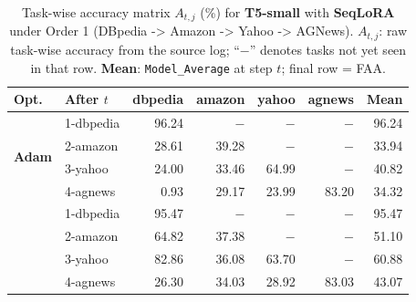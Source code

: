 \begin{table}[ht]
\centering
\caption{%
  Task-wise accuracy matrix $A_{t,j}$ (\%) for \textbf{T5-small} with \textbf{SeqLoRA} under Order 1 (DBpedia -> Amazon -> Yahoo -> AGNews).
  $A_{t,j}$: raw task-wise accuracy from the source log; ``$-$'' denotes tasks not yet seen in that row.
  \textbf{Mean}: \texttt{Model\_Average} at step $t$; final row = FAA.
}
\label{tab:nlp_o1_t5small_seqlora}
\setlength{\tabcolsep}{4.0pt}
\renewcommand{\arraystretch}{0.92}
\scriptsize
\begin{tabular}{@{}l l r r r r r@{}}
\toprule
\textbf{Opt.} & \textbf{After $t$} & \textbf{dbpedia} & \textbf{amazon} & \textbf{yahoo} & \textbf{agnews} & \textbf{Mean} \\
\midrule
\multirow{4}{*}{\textbf{Adam}} & 1-dbpedia & 96.24 & $-$ & $-$ & $-$ & 96.24 \\
 & 2-amazon & 28.61 & 39.28 & $-$ & $-$ & 33.94 \\
 & 3-yahoo & 24.00 & 33.46 & 64.99 & $-$ & 40.82 \\
 & 4-agnews & 0.93 & 29.17 & 23.99 & 83.20 & 34.32 \\
\addlinespace[2pt]
\multirow{4}{*}{\textbf{SAM}} & 1-dbpedia & 95.47 & $-$ & $-$ & $-$ & 95.47 \\
 & 2-amazon & 64.82 & 37.38 & $-$ & $-$ & 51.10 \\
 & 3-yahoo & 82.86 & 36.08 & 63.70 & $-$ & 60.88 \\
 & 4-agnews & 26.30 & 34.03 & 28.92 & 83.03 & 43.07 \\
\bottomrule
\end{tabular}
\end{table}

